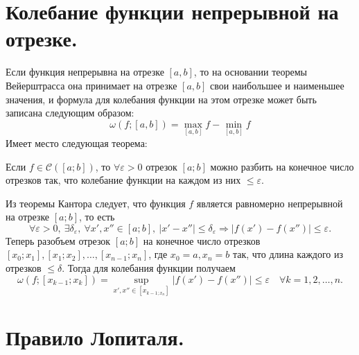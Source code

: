 	\section{Колебание функции непрерывной на отрезке.}
	Если функция непрерывна на отрезке $[a, b]$, то на основании теоремы Вейерштрасса она принимает на отрезке $[a, b]$ свои наибольшее и наименьшее значения, и формула для колебания функции на этом отрезке может быть записана следующим образом:
	$$\omega(f; [a, b]) = \max\limits_{[a, b]}{f} - \min\limits_{[a, b]}{f}$$
	Имеет место следующая теорема:
	\begin{theorem}
		Если $f \in \mathcal{C}([a; b])$, то $\forall \varepsilon > 0$ отрезок $[a; b]$ можно разбить на конечное число отрезков так, что колебание функции на каждом из них $\leqslant \varepsilon$.
	\end{theorem}
	\begin{Proof}
		Из теоремы Кантора следует, что функция $f$ является равномерно непрерывной на отрезке $[a; b]$, то есть
		$$\forall \varepsilon > 0,\ \exists \delta_\varepsilon,\ \forall x', x'' \in [a; b],\ \vert x' - x''\vert \leqslant \delta_\varepsilon \Rightarrow \vert f(x') - f(x'') \vert \leqslant \varepsilon.$$
		Теперь разобъем отрезок $[a; b]$ на конечное число отрезков $[x_0; x_1], [x_1; x_2], \dots, [x_{n - 1}; x_n]$, где $x_0 = a, x_n = b$ так, что длина каждого из отрезков $\leqslant \delta$. Тогда для колебания функции получаем
		$$\omega(f; [x_{k - 1}; x_k]) = \sup\limits_{x', x'' \in [x_{k - 1; x_n}]}{\vert f(x') - f(x'')\vert} \leqslant \varepsilon \quad \forall k = 1, 2, \dots, n.$$
	\end{Proof}
	\section{Правило Лопиталя.}

